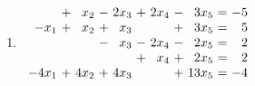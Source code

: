 \documentclass{article}
\begin{document}
\begin{enumerate}
\item 
$\begin{array}{r@{\ }c@{\ }r@{\ }c@{\ }r@{\ }c@{\ }r@{\ }c@{\ }r@{\ }c@{\ }r@{\ }c@{\ }}
& +& x_{2}& -& 2x_{3}& +& 2x_{4}& -& 3x_{5}&=&-5 \\
 -x_{1}& +& x_{2}& +& x_{3}&&& +& 3x_{5}&=&5 \\
 &&& -& x_{3}& -& 2x_{4}& -& 2x_{5}&=&2 \\
 &&&&& +& x_{4}& +& 2x_{5}&=&2 \\
 -4x_{1}& +& 4x_{2}& +& 4x_{3}&&& +& 13x_{5}&=&-4 \\
 \end{array}$
\end{enumerate}
\end{document}
